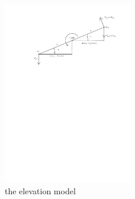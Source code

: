 \begin{figure}[H]
\caption{the elevation model}
\label{fig:elevation_model}
\includegraphics[width=0.5\textwidth]{images/elevation_model}
\end{figure}

